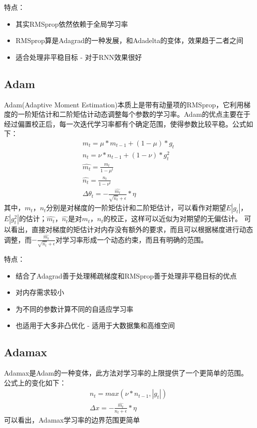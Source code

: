 特点：
\begin{itemize}
\item 其实RMSprop依然依赖于全局学习率
\item RMSprop算是Adagrad的一种发展，和Adadelta的变体，效果趋于二者之间
\item 适合处理非平稳目标 - 对于RNN效果很好
\end{itemize}

\subsection{Adam}
Adam(Adaptive Moment Estimation)本质上是带有动量项的RMSprop，它利用梯度的一阶矩估计和二阶矩估计动态调整每个参数的学习率。Adam的优点主要在于经过偏置校正后，每一次迭代学习率都有个确定范围，使得参数比较平稳。公式如下：
\begin{eqnarray*}
m_t=\mu*m_{t-1}+(1-\mu)*g_t \\
n_t=\nu*n_{t-1}+(1-\nu)*g_t^2 \\
\hat{m_t}=\frac{m_t}{1-\mu^t}  \\
\hat{n_t}=\frac{n_t}{1-\nu^t}  \\
\Delta{\theta_t}=-\frac{\hat{m_t}}{\sqrt{\hat{n_t}}+\epsilon}*\eta
\end{eqnarray*}
其中，$m_t$，$n_t$分别是对梯度的一阶矩估计和二阶矩估计，可以看作对期望$E|g_t|$，$E|g_t^2|$的估计；$\hat{m_t}$，$\hat{n_t}$是对$m_t$，$n_t$的校正，这样可以近似为对期望的无偏估计。 可以看出，直接对梯度的矩估计对内存没有额外的要求，而且可以根据梯度进行动态调整，而$-\frac{\hat{m_t}}{\sqrt{\hat{n_t}}+\epsilon}$对学习率形成一个动态约束，而且有明确的范围。

特点：
\begin{itemize}
\item 结合了Adagrad善于处理稀疏梯度和RMSprop善于处理非平稳目标的优点
\item 对内存需求较小
\item 为不同的参数计算不同的自适应学习率
\item 也适用于大多非凸优化 - 适用于大数据集和高维空间
\end{itemize}

\subsection{Adamax}
Adamax是Adam的一种变体，此方法对学习率的上限提供了一个更简单的范围。公式上的变化如下：
\begin{eqnarray*}
n_t=max(\nu*n_{t-1},|g_t|)  \\
\Delta{x}=-\frac{\hat{m_t}}{n_t+\epsilon}*\eta
\end{eqnarray*}
可以看出，Adamax学习率的边界范围更简单

